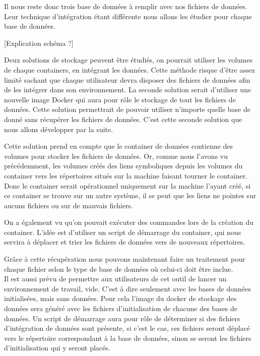 Il nous reste donc trois base de données à remplir avec nos fichiers de données. Leur technique d'intégration étant différente nous allons les étudier pour chaque base de données. 

[Explication schéma ?] 

Deux solutions de stockage peuvent être étudiés, on pourrait utiliser les volumes de chaque containers, en intégrant les données. Cette méthode risque d'être assez limité sachant que chaque utilisateur devra disposer des fichiers de données afin de les intégrer dans son environnement. La seconde solution serait d'utiliser une nouvelle image Docker qui aura pour rôle le stockage de tout les fichiers de données. Cette solution permettrait de pouvoir utiliser n'importe quelle base de donné sans récupérer les fichiers de données. C'est cette seconde solution que nous allons développer par la suite.

Cette solution prend en compte que le container de données contienne des volumes pour stocker les fichiers de données. Or, comme nous l'avons vu précédemment, les volumes créés des liens symboliques depuis les volumes du container vers les répertoires situés sur la machine faisant tourner le container. Donc le container serait opérationnel uniquement sur la machine l'ayant créé, si ce container se trouve sur un autre système, il se peut que les liens ne pointes sur aucuns fichiers ou sur de mauvais fichiers. 

On a également vu qu'on pouvait exécuter des commandes lors de la création du container. L'idée est d'utiliser un script de démarrage du container, qui nous servira à déplacer et trier les fichiers de données vers de nouveaux répertoires.

Grâce à cette récupération nous pouvons maintenant faire un traitement pour chaque fichier selon le type de base de données où celui-ci doit être inclue.\\

Il est aussi prévu de permettre aux utilisateurs de cet outil de lancer un environnement de travail, vide. C'est à dire seulement avec les bases de données initialisées, mais sans données. Pour cela l'image du docker de stockage des données sera généré avec les fichiers d'initialisation de chacune des bases de données. Un script de démarrage aura pour rôle de déterminer si des fichiers d'intégration de données sont présente, si c'est le cas, ces fichiers seront déplacé vers le répertoire correspondant à la base de données, sinon se seront les fichiers d'initialisation qui y seront placés. 

